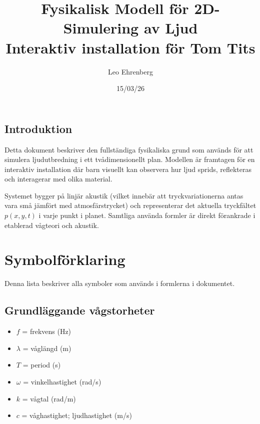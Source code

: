 \documentclass[11pt,a4paper]{article}
\title{
\vspace{3cm}
\Huge \textbf{Fysikalisk Modell för 2D-Simulering av Ljud} \\
\vspace{0.5cm}
\Large Interaktiv installation för Tom Tits
}
\author{Leo Ehrenberg}
\date{15/03/26}
\begin{document}
\maketitle
\thispagestyle{empty}

\vspace{2cm}

\begin{center}
\begin{minipage}{0.85\textwidth}
\section*{Introduktion}

Detta dokument beskriver den fullständiga fysikaliska grund som används för att
simulera ljudutbredning i ett tvådimensionellt plan. Modellen är framtagen
för en interaktiv installation där barn visuellt kan observera hur ljud
sprids, reflekteras och interagerar med olika material.

Systemet bygger på linjär akustik (vilket innebär att tryckvariationerna antas vara små
jämfört med atmosfärstrycket) och representerar det aktuella tryckfältet
$p(x,y,t)$ i varje punkt i planet. Samtliga använda formler är direkt
förankrade i etablerad vågteori och akustik.

\end{minipage}
\end{center}

\newpage

\tableofcontents

\newpage

\section{Symbolförklaring}
Denna lista beskriver alla symboler som används i formlerna i dokumentet.

\subsection*{Grundläggande vågstorheter}
\begin{itemize}[leftmargin=*,nosep]
  \item $f$ = frekvens (Hz)
  \item $\lambda$ = våglängd (m)
  \item $T$ = period (s)
  \item $\omega$ = vinkelhastighet (rad/s)
  \item $k$ = vågtal (rad/m)
  \item $c$ = våghastighet; ljudhastighet (m/s)
\end{itemize}
\end{document}
